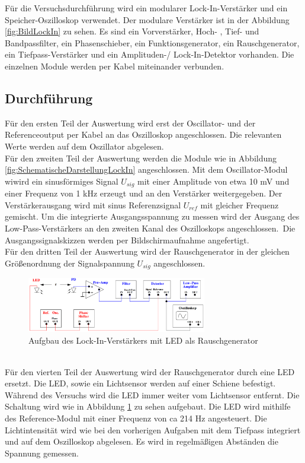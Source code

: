 Für die Versuchsdurchführung wird ein modularer Lock-In-Verstärker und ein Speicher-Oszilloskop verwendet.
Der modulare Verstärker ist in der Abbildung \ref{fig:BildLockIn} zu sehen. Es sind ein Vorverstärker, Hoch-
, Tief- und Bandpassfilter, ein Phasenschieber, ein Funktionsgenerator, ein Rauschgenerator, ein Tiefpass-Verstärker
und ein Amplituden-/ Lock-In-Detektor vorhanden. Die einzelnen Module werden per Kabel miteinander verbunden.

\subsection{Durchführung}
\label{sec:Durchführung}

Für den ersten Teil der Auswertung wird erst der Oscillator- und der Referenceoutput per Kabel an das Oszilloskop angeschlossen. 
Die relevanten Werte werden auf dem Oszillator abgelesen.\\
Für den zweiten Teil der Auswertung werden die Module wie in Abbildung \ref{fig:SchematischeDarstellungLockIn} angeschlossen.
Mit dem Oscillator-Modul wiwird ein sinusförmiges Signal $U_{sig}$ mit einer Amplitude von etwa 10 mV und einer Frequenz von 1 kHz erzeugt
und an den Verstärker weitergegeben. Der Verstärkerausgang wird mit sinus Referenzsignal $U_{ref}$ mit gleicher Frequenz gemischt.
Um die integrierte Ausgangsspannung zu messen wird der Ausgang des Low-Pass-Verstärkers an den zweiten Kanal des Oszilloskops angeschlossen.\
Die Ausgangssignalskizzen werden per Bildschirmaufnahme angefertigt.\\
Für den dritten Teil der Auswertung wird der Rauschgenerator in der gleichen Größenordnung der Signalspannung $U_{sig}$ angeschlossen.\\
\begin{figure}
    \centering
    \includegraphics[width=0.7\textwidth]{img/LED.png}
    \caption{Aufgbau des Lock-In-Verstärkers mit LED als Rauschgenerator}
    \label{fig:LED}
\end{figure}
\\
Für den vierten Teil der Auswertung wird der Rauschgenerator durch eine LED ersetzt. 
Die LED, sowie ein Lichtsensor werden auf einer Schiene befestigt. Während des Versuchs wird die LED immer weiter vom 
Lichtsensor entfernt.
Die Schaltung wird wie in Abbildung \ref{fig:LED} zu sehen aufgebaut.
Die LED wird mithilfe des Reference-Modul mit einer Frequenz von ca 214 Hz angesteuert.
Die Lichtintensität wird wie bei den vorherigen Aufgaben mit dem Tiefpass integriert und auf dem Oszilloskop abgelesen.
Es wird in regelmäßigen Abständen die Spannung gemessen.\\